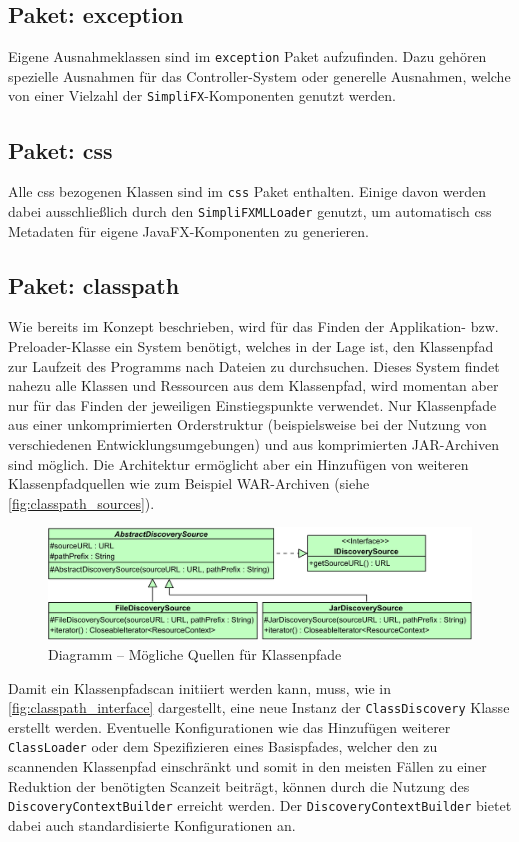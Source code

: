 \subsection{Paket: exception}
Eigene Ausnahmeklassen sind im \texttt{exception} Paket aufzufinden. Dazu gehören spezielle Ausnahmen für das Controller-System oder generelle Ausnahmen, welche von einer Vielzahl der \texttt{SimpliFX}-Komponenten genutzt werden.
\subsection{Paket: css}
Alle \ac{css} bezogenen Klassen sind im \texttt{css} Paket enthalten. Einige davon werden dabei ausschließlich durch den \texttt{SimpliFXMLLoader} genutzt, um automatisch \ac{css} Metadaten für eigene JavaFX-Komponenten zu generieren. 
\subsection{Paket: classpath}
Wie bereits im Konzept beschrieben, wird für das Finden der Applikation- bzw. Preloader-Klasse ein System benötigt, welches in der Lage ist, den Klassenpfad zur Laufzeit des Programms nach Dateien zu durchsuchen. Dieses System findet nahezu alle Klassen und Ressourcen aus dem Klassenpfad, wird momentan aber nur für das Finden der jeweiligen Einstiegspunkte verwendet. Nur Klassenpfade aus einer unkomprimierten Orderstruktur (beispielsweise bei der Nutzung von verschiedenen Entwicklungsumgebungen) und aus komprimierten JAR-Archiven sind möglich. Die Architektur ermöglicht aber ein Hinzufügen von weiteren Klassenpfadquellen wie zum Beispiel WAR-Archiven (siehe \autoref{fig:classpath_sources}). 
\begin{figure}[H]
	\centering
	\includegraphics[width=\textwidth-2cm]{Abbildungen/Klassenpfadscan-Sources.png}
	\caption{Diagramm -- Mögliche Quellen für Klassenpfade}
	\label{fig:classpath_sources}
\end{figure}
\noindent Damit ein Klassenpfadscan initiiert werden kann, muss, wie in \autoref{fig:classpath_interface} dargestellt, eine neue Instanz der \texttt{ClassDiscovery} Klasse erstellt werden. Eventuelle Konfigurationen wie das Hinzufügen weiterer \texttt{ClassLoader} oder dem Spezifizieren eines Basispfades, welcher den zu scannenden Klassenpfad einschränkt und somit in den meisten Fällen zu einer Reduktion der benötigten Scanzeit beiträgt, können durch die Nutzung des \texttt{DiscoveryContextBuilder} erreicht werden. Der \texttt{DiscoveryContextBuilder} bietet dabei auch standardisierte Konfigurationen an.
